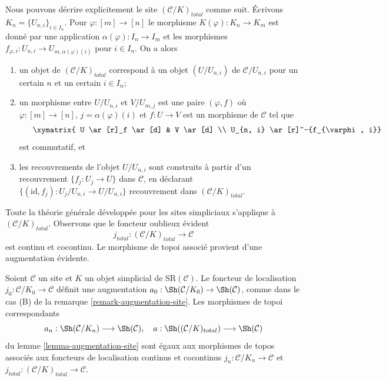 \medskip\noindent
Nous pouvons décrire explicitement le site $(\mathcal{C}/K)_{total}$ comme suit.
Écrivons $K_n = \{U_{n, i}\}_{i \in I_n}$. Pour $\varphi : [m] \to [n]$
le morphisme $K(\varphi) : K_n \to K_m$ est donné par une application
$\alpha(\varphi) : I_n \to I_m$ et les morphismes
$f_{\varphi, i} : U_{n, i} \to U_{m, \alpha(\varphi)(i)}$ pour $i \in I_n$.
On a alors
\begin{enumerate}
\item un objet de $(\mathcal{C}/K)_{total}$
correspond à un objet $(U/U_{n, i})$
de $\mathcal{C}/U_{n, i}$ pour un certain $n$ et un certain $i \in I_n$;
\item un morphisme entre $U/U_{n, i}$ et $V/U_{m, j}$
est une paire $(\varphi, f)$ où $\varphi : [m] \to [n]$,
$j = \alpha(\varphi)(i)$ et $f : U \to V$ est un morphisme de
$\mathcal{C}$ tel que
$$
\vcenter{
\xymatrix{
U \ar[r]_f \ar[d] & V \ar[d] \\
U_{n, i} \ar[r]^-{f_{\varphi, i}} &
U_{m, j}
}
}
$$
est commutatif, et
\item les recouvrements de l'objet $U/U_{n, i}$ sont construits
à partir d'un recouvrement $\{f_j : U_j \to U\}$ dans $\mathcal{C}$, en déclarant
$\{(\text{id}, f_j) : U_j/U_{n, i} \to U/U_{n, i}\}$
recouvrement dans $(\mathcal{C}/K)_{total}$.
\end{enumerate}
Toute la théorie générale développée pour les sites simpliciaux s'applique à
$(\mathcal{C}/K)_{total}$. Observons que le foncteur oublieux évident
$$
j_{total} : (\mathcal{C}/K)_{total} \longrightarrow \mathcal{C}
$$
est continu et cocontinu. Le morphisme de topoi
associé provient d'une augmentation évidente.

\begin{lemma}
\label{lemma-augmentation-simplicial-semi-representable}
Soient $\mathcal{C}$ un site et $K$ un objet simplicial de
$\text{SR}(\mathcal{C})$. Le foncteur de localisation
$j_0 : \mathcal{C}/K_0 \to \mathcal{C}$ définit une augmentation
$a_0 : \Sh(\mathcal{C}/K_0) \to \Sh(\mathcal{C})$, comme dans le cas (B) de
la remarque \ref{remark-augmentation-site}.
Les morphismes de topoi correspondants
$$
a_n : \Sh(\mathcal{C}/K_n) \longrightarrow \Sh(\mathcal{C}),\quad
a : \Sh((\mathcal{C}/K)_{total}) \longrightarrow \Sh(\mathcal{C})
$$
du lemme \ref{lemma-augmentation-site}
sont égaux aux morphismes de topos associés aux
foncteurs de localisation continus et cocontinus
$j_n : \mathcal{C}/K_n \to \mathcal{C}$ et
$j_{total} : (\mathcal{C}/K)_{total} \to \mathcal{C}$.
\end{lemma}

